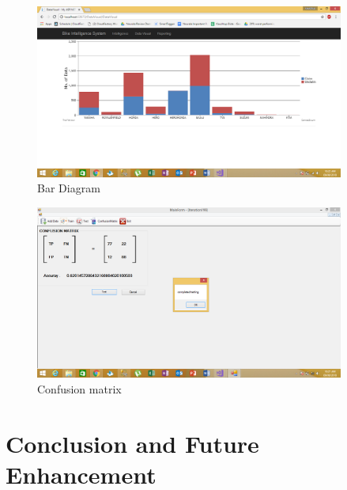 \begin{figure}[tbh] %
\begin{center}
	\includegraphics[width=4in]{images/Screenshot4.png}
	\caption{Bar Diagram}  %
	\label{Output Preview} %
\end{center}
\end{figure}
\newpage
\begin{figure}[tbh] %
\begin{center}
	\includegraphics[width=4in]{images/Screenshot5.png}
	\caption{Confusion matrix}  %
	\label{Tesing Output Confusion Matrix} %
\end{center}
\end{figure}










\chapter{Conclusion and Future Enhancement}
